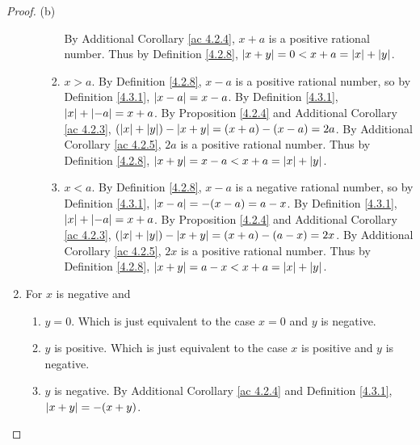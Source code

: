 \begin{proof}{(b)}
\begin{enumerate}[label=(\Roman*)]
\begin{enumerate}[label=(\roman*)]
\begin{enumerate}[label=(\arabic*)]
                                  By Additional Corollary \ref{ac 4.2.4}, \(x + a\) is a positive rational number.
                                  Thus by Definition \ref{4.2.8}, \(\abs*{x + y} = 0 < x + a = \abs*{x} + \abs*{y}\).
                            \item \(x > a\).
                                  By Definition \ref{4.2.8}, \(x - a\) is a positive rational number, so by Definition \ref{4.3.1}, \(\abs*{x - a} = x - a\).
                                  By Definition \ref{4.3.1}, \(\abs*{x} + \abs*{-a} = x + a\).
                                  By Proposition \ref{4.2.4} and Additional Corollary \ref{ac 4.2.3}, \((\abs*{x} + \abs*{y}) - \abs*{x + y} = (x + a) - (x - a) = 2a\).
                                  By Additional Corollary \ref{ac 4.2.5}, \(2a\) is a positive rational number.
                                  Thus by Definition \ref{4.2.8}, \(\abs*{x + y} = x - a < x + a = \abs*{x} + \abs*{y}\).
                            \item \(x < a\).
                                  By Definition \ref{4.2.8}, \(x - a\) is a negative rational number, so by Definition \ref{4.3.1}, \(\abs*{x - a} = -(x - a) = a - x\).
                                  By Definition \ref{4.3.1}, \(\abs*{x} + \abs*{-a} = x + a\).
                                  By Proposition \ref{4.2.4} and Additional Corollary \ref{ac 4.2.3}, \((\abs*{x} + \abs*{y}) - \abs*{x + y} = (x + a) - (a - x) = 2x\).
                                  By Additional Corollary \ref{ac 4.2.5}, \(2x\) is a positive rational number.
                                  Thus by Definition \ref{4.2.8}, \(\abs*{x + y} = a - x < x + a = \abs*{x} + \abs*{y}\).
                        \end{enumerate}
              \end{enumerate}
        \item For \(x\) is negative and
              \begin{enumerate}[label=(\roman*)]
                  \item \(y = 0\).
                        Which is just equivalent to the case \(x = 0\) and \(y\) is negative.
                  \item \(y\) is positive.
                        Which is just equivalent to the case \(x\) is positive and \(y\) is negative.
                  \item \(y\) is negative.
                        By Additional Corollary \ref{ac 4.2.4} and Definition \ref{4.3.1}, \(\abs*{x + y} = -(x + y)\).

\end{enumerate}
\end{enumerate}
\end{proof}
